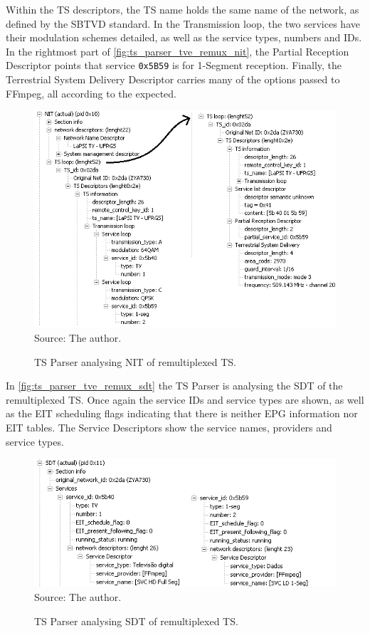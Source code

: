 \documentclass[12pt,a4paper]{article}
\begin{document}
Within the TS descriptors, the TS name holds the same name of the network, as defined by the SBTVD standard. In the Transmission loop, the two services have their modulation schemes detailed, as well as the service types, numbers and IDs. In the rightmost part of \autoref{fig:ts_parser_tve_remux_nit}, the Partial Reception Descriptor points that service \texttt{0x5B59} is for 1-Segment reception. Finally, the Terrestrial System Delivery Descriptor carries many of the options passed to FFmpeg, all according to the expected.

\begin{figure}[!h]
\centering
\caption{TS Parser analysing NIT of remultiplexed TS.}
\includegraphics[width=0.9\linewidth]{pictures/ts_parser_tve_remux_nit.png}
\\Source: The author.
\label{fig:ts_parser_tve_remux_nit}
\end{figure}

In \autoref{fig:ts_parser_tve_remux_sdt} the TS Parser is analysing the SDT of the remultiplexed TS. Once again the service IDs and service types are shown, as well as the EIT scheduling flags indicating that there is neither EPG information nor EIT tables. The Service Descriptors show the service names, providers and service types.

\begin{figure}[!h]
\centering
\caption{TS Parser analysing SDT of remultiplexed TS.}
\includegraphics[width=0.9\linewidth]{pictures/ts_parser_tve_remux_sdt.png}
\\Source: The author.
\label{fig:ts_parser_tve_remux_sdt}
\end{figure}
\end{document}
